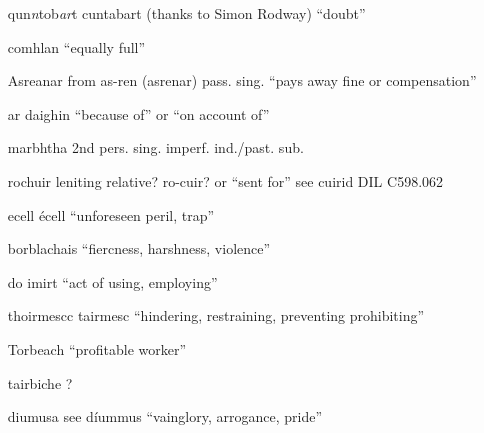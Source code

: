 \documentclass[11pt]{article}
\begin{document}
\begin{enumerate}
  \item[qun\emph{n}tob\emph{ar}t] cuntabart (thanks to Simon Rodway) \enquote{doubt}

  \item[comhlan] \enquote{equally full}

  \item[Asreanar] from as-ren (asrenar) pass. sing. \enquote{pays away fine or compensation}

  \item[ar daighin] \enquote{because of} or \enquote{on account of}
  \item[marbhtha] 2nd pers. sing. imperf. ind./past. sub.
  \item[rochuir] leniting relative? ro-cuir? or \enquote{sent for} see cuirid DIL C598.062
  \item[ecell] \'{e}cell \enquote{unforeseen peril, trap}
  \item[borblachais] \enquote{fiercness, harshness, violence}
  \item[do imirt] \enquote{act of using, employing}
  \item[thoirmescc] tairmesc \enquote{hindering, restraining, preventing prohibiting}
  \item[Torbeach] \enquote{profitable worker}
  \item[tairbiche] ? 
  \item[diumusa] see d\'{i}ummus \enquote{vainglory, arrogance, pride}
  
\end{enumerate}
\end{document}
